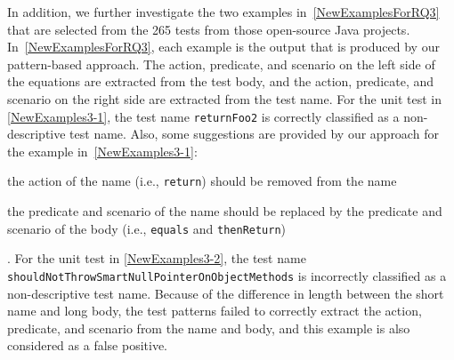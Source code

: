In addition, we further investigate the two examples in~\cref{NewExamplesForRQ3} that are selected from the \num{265} tests from those open-source Java projects.
%
In~\cref{NewExamplesForRQ3}, each example is the output that is produced by our pattern-based approach.
%
The action, predicate, and scenario on the left side of the equations are extracted from the test body, and the action, predicate, and scenario on the right side are extracted from the test name.
%
For the unit test in \cref{NewExamples3-1}, the test name \texttt{returnFoo2} is correctly classified as a non-descriptive test name.
%
Also, some suggestions are provided by our approach for the example in~\cref{NewExamples3-1}: 
\begin{enumerate*}
    \item the action of the name (i.e., \texttt{return}) should be removed from the name
    \item the predicate and scenario of the name should be replaced by the predicate and scenario of the body (i.e., \texttt{equals} and \texttt{thenReturn})
\end{enumerate*}.
%
For the unit test in \cref{NewExamples3-2}, the test name \texttt{shouldNotThrowSmartNullPointerOnObjectMethods} is incorrectly classified as a non-descriptive test name.
%
Because of the difference in length between the short name and long body, the test patterns failed to correctly extract the action, predicate, and scenario from the name and body, and this example is also considered as a false positive.